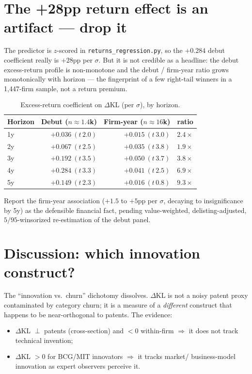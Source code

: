 \documentclass[11pt]{report}
\newcommand{\dkl}{$\Delta$KL}
\begin{document}
\section{The +28pp return effect is an artifact --- drop it}
The predictor is $z$-scored in \texttt{returns\_regression.py}, so the
$+0.284$ debut coefficient really is $+28$pp per $\sigma$. But it is not credible
as a headline: the debut excess-return profile is non-monotone and the debut /
firm-year ratio grows monotonically with horizon --- the fingerprint of a few
right-tail winners in a 1{,}447-firm sample, not a return premium.

\begin{table}[h]\centering\small
\caption{Excess-return coefficient on \dkl{} (per $\sigma$), by horizon.}
\begin{tabular}{lrrr}
\toprule
Horizon & Debut ($n\!\approx\!1.4$k) & Firm-year ($n\!\approx\!16$k) & ratio \\
\midrule
1y & $+0.036\ (t\,2.0)$ & $+0.015\ (t\,3.0)$ & $2.4\times$ \\
2y & $+0.067\ (t\,2.5)$ & $+0.035\ (t\,3.8)$ & $1.9\times$ \\
3y & $+0.192\ (t\,3.5)$ & $+0.050\ (t\,3.7)$ & $3.8\times$ \\
4y & $+0.284\ (t\,3.3)$ & $+0.041\ (t\,2.5)$ & $6.9\times$ \\
5y & $+0.149\ (t\,2.3)$ & $+0.016\ (t\,0.8)$ & $9.3\times$ \\
\bottomrule
\end{tabular}
\end{table}

\noindent Report the firm-year association ($+1.5$ to $+5$pp per $\sigma$, decaying
to insignificance by 5y) as the defensible financial fact, pending value-weighted,
delisting-adjusted, $5/95$-winsorized re-estimation of the debut panel.

\section{Discussion: which innovation construct?}
The ``innovation vs.\ churn'' dichotomy dissolves. \dkl{} is not a noisy patent
proxy contaminated by category churn; it is a measure of a \emph{different}
construct that happens to be near-orthogonal to patents. The evidence:

\begin{itemize}[nosep]
\item \dkl{} $\perp$ patents (cross-section) and $<0$ within-firm $\Rightarrow$
it does not track technical invention;
\item \dkl{} $> 0$ for BCG/MIT innovators $\Rightarrow$ it tracks market/
business-model innovation as expert observers perceive it.
\end{itemize}
\end{document}
